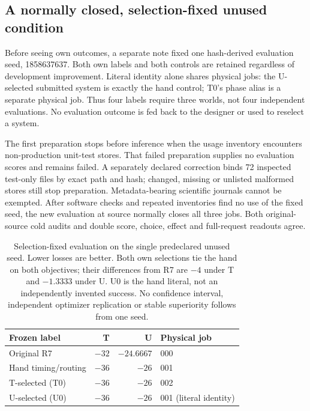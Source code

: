 \subsection{A normally closed, selection-fixed unused condition}
Before seeing own outcomes, a separate note fixed one hash-derived evaluation
seed, 1858637637. Both own labels and both controls are retained regardless of
development improvement. Literal identity alone shares physical jobs: the
U-selected submitted system is exactly the hand control; T0's phase alias is
a separate physical job. Thus four labels require three worlds, not four
independent evaluations. No evaluation outcome is fed back to the designer or
used to reselect a system.

The first preparation stops before inference when the usage inventory
encounters non-production unit-test stores. That failed preparation supplies
no evaluation scores and remains failed. A separately declared correction
binds 72 inspected test-only files by exact path and hash; changed, missing or
unlisted malformed stores still stop preparation. Metadata-bearing scientific
journals cannot be exempted. After software checks and repeated inventories
find no use of the fixed seed, the new evaluation at source 
normally closes all three jobs. Both original-source cold audits and double
score, choice, effect and full-request readouts agree.

\begin{table}[t]
\centering\small
\begin{tabular}{lrrl}
\toprule
Frozen label & T & U & Physical job\\
\midrule
Original R7 & $-32$ & $-24.6667$ & 000\\
Hand timing/routing & $-36$ & $-26$ & 001\\
T-selected (T0) & $-36$ & $-26$ & 002\\
U-selected (U0) & $-36$ & $-26$ & 001 (literal identity)\\
\bottomrule
\end{tabular}
\caption{Selection-fixed evaluation on the single predeclared unused seed.
Lower losses are better. Both own selections tie the hand on both objectives;
their differences from R7 are $-4$ under T and $-1.3333$ under U. U0 is the
hand literal, not an independently invented success. No confidence interval,
independent optimizer replication or stable superiority follows from one seed.}
\label{tab:workflow-feedback-unused}
\end{table}

